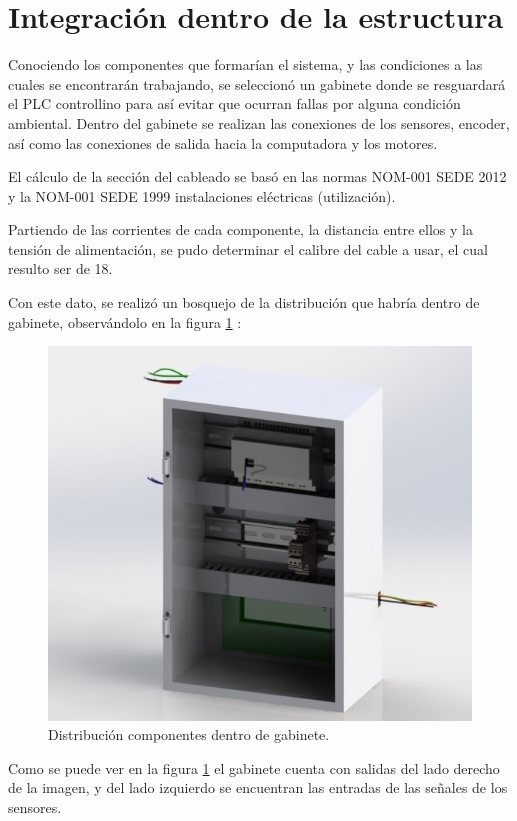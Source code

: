 \section{Integración dentro de la estructura}
Conociendo los componentes que formarían el sistema, y las condiciones a las cuales se encontrarán trabajando, se seleccionó un gabinete donde se resguardará el PLC controllino para así evitar que ocurran fallas por alguna condición ambiental. 
Dentro del gabinete se realizan las conexiones de los sensores, encoder, así como las conexiones de salida hacia la computadora y los motores.

El cálculo de la sección del cableado se basó en las normas NOM-001 SEDE 2012 y la NOM-001 SEDE 1999 instalaciones eléctricas (utilización). 

Partiendo de las corrientes de cada componente, la distancia entre ellos y la tensión de alimentación, se pudo determinar el calibre del cable a usar, el cual resulto ser de 18. 

Con este dato, se realizó un bosquejo de la distribución que habría dentro de gabinete, observándolo en la figura \ref{fig:gabinete1} :

\begin{figure}[H]
	\centering
	\includegraphics[scale=0.6]{imagenes/gabinete1.jpg}
	\caption{Distribución componentes dentro de gabinete.}
	\label{fig:gabinete1}
\end{figure}

Como se puede ver en la figura \ref{fig:gabinete1} el gabinete cuenta con salidas del lado derecho de la imagen, y del lado izquierdo se encuentran las entradas de las señales de los sensores. 

